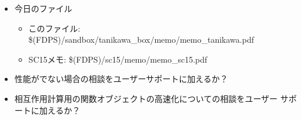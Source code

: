 \begin{itemize}
\item 今日のファイル
  \begin{itemize}
  \item このファイル: \$(FDPS)/sandbox/tanikawa\_box/memo/memo\_tanikawa.pdf
  \item SC15メモ: \$(FDPS)/sc15/memo/memo\_sc15.pdf
  \end{itemize}
\item 性能がでない場合の相談をユーザーサポートに加えるか？
\item 相互作用計算用の関数オブジェクトの高速化についての相談をユーザー
  サポートに加えるか？
\end{itemize}
